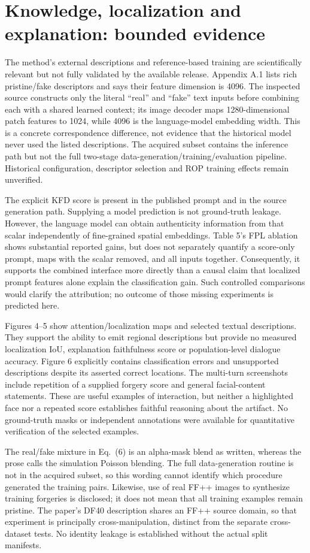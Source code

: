 \documentclass[10pt]{article}
\begin{document}
\section*{Knowledge, localization and explanation: bounded evidence}
The method’s external descriptions and reference-based training are scientifically relevant but not fully validated by the available release. Appendix A.1 lists rich pristine/fake descriptors and says their feature dimension is 4096. The inspected source constructs only the literal “real” and “fake” text inputs before combining each with a shared learned context; its image decoder maps 1280-dimensional patch features to 1024, while 4096 is the language-model embedding width. This is a concrete correspondence difference, not evidence that the historical model never used the listed descriptions. The acquired subset contains the inference path but not the full two-stage data-generation/training/evaluation pipeline. Historical configuration, descriptor selection and ROP training effects remain unverified.\par
The explicit KFD score is present in the published prompt and in the source generation path. Supplying a model prediction is not ground-truth leakage. However, the language model can obtain authenticity information from that scalar independently of fine-grained spatial embeddings. Table 5’s FPL ablation shows substantial reported gains, but does not separately quantify a score-only prompt, maps with the scalar removed, and all inputs together. Consequently, it supports the combined interface more directly than a causal claim that localized prompt features alone explain the classification gain. Such controlled comparisons would clarify the attribution; no outcome of those missing experiments is predicted here.\par
Figures 4–5 show attention/localization maps and selected textual descriptions. They support the ability to emit regional descriptions but provide no measured localization IoU, explanation faithfulness score or population-level dialogue accuracy. Figure 6 explicitly contains classification errors and unsupported descriptions despite its asserted correct locations. The multi-turn screenshots include repetition of a supplied forgery score and general facial-content statements. These are useful examples of interaction, but neither a highlighted face nor a repeated score establishes faithful reasoning about the artifact. No ground-truth masks or independent annotations were available for quantitative verification of the selected examples.\par
The real/fake mixture in Eq. (6) is an alpha-mask blend as written, whereas the prose calls the simulation Poisson blending. The full data-generation routine is not in the acquired subset, so this wording cannot identify which procedure generated the training pairs. Likewise, use of real FF++ images to synthesize training forgeries is disclosed; it does not mean that all training examples remain pristine. The paper’s DF40 description shares an FF++ source domain, so that experiment is principally cross-manipulation, distinct from the separate cross-dataset tests. No identity leakage is established without the actual split manifests.\par
\end{document}
